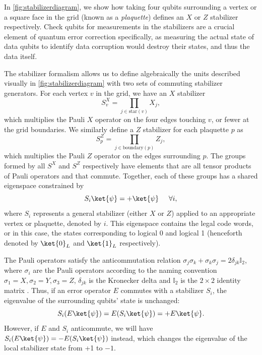 In \cref{fig:stabilizerdiagram}, we show how taking four qubits surrounding a vertex or a square face in the grid (known as a \emph{plaquette}) defines an $X$ or $Z$ stabilizer respectively. Check qubits for measurements in the stabilizers are a crucial element of quantum error correction specifically, as measuring the actual state of data qubits to identify data corruption would destroy their states, and thus the data itself. 

The stabilizer formalism allows us to define algebraically the units described visually in \cref{fig:stabilizerdiagram} with two sets of commuting stabilizer generators. For each vertex $v$ in the grid, we have an $X$ stabilizer
\[S^X_v = \prod_{j \in \text{star}(v)} X_j,\]
which multiplies the Pauli $X$ operator on the four edges touching $v$, or fewer at the grid boundaries. We similarly define a $Z$ stabilizer for each plaquette $p$ as
\[S^Z_p = \prod_{j \in \text{boundary}(p)} Z_j,\]
which multiplies the Pauli $Z$ operator on the edges surrounding $p$. The groups formed by all $S^X$ and $S^Z$ respectively have elements that are all tensor products of Pauli operators and that commute. Together, each of these groups has a shared eigenspace constrained by 
\[S_i \ket{\psi} = + \ket{\psi} \hspace{0.5cm} \forall i,\]
where $S_i$ represents a general stabilizer (either $X$ or $Z$) applied to an appropriate vertex or plaquette, denoted by $i$. This eigenspace contains the legal code words, or in this case, the states corresponding to logical 0 and logical 1 (henceforth denoted by $\ket{0}_L$ and $\ket{1}_L$ respectively).

The Pauli operators satisfy the anticommutation relation $\sigma_j \sigma_k + \sigma_k \sigma_j  = 2\delta_{jk} \mathbb{I}_2$, where $\sigma_i$ are the Pauli operators according to the naming convention $\sigma_1 = X, \sigma_2 = Y, \sigma_3 = Z$, $\delta_{jk}$ is the Kronecker delta and $\mathbb{I}_2$ is the $2 \times 2$ identity matrix \cite{paulimatrices}. Thus, if an error operator $E$ commutes with a stabilizer $S_i$, the eigenvalue of the surrounding qubits' state is unchanged:
\[
S_i(E\ket{\psi}) = E(S_i\ket{\psi}) = +E\ket{\psi}.
\]
However, if $E$ and $S_i$ anticommute, we will have $S_i(E\ket{\psi}) = -E(S_i\ket{\psi})$ instead, which changes the eigenvalue of the local stabilizer state from +1 to $-1$. 


